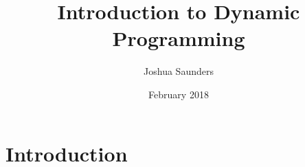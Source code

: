 \documentclass{article}
\title{Introduction to Dynamic Programming}
\author{Joshua Saunders}
\date{February 2018}
\begin{document}
\maketitle

\section{Introduction}



\end{document}
